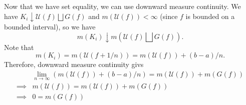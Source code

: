 \documentclass{article}
\begin{document}
\begin{enumerate}
\begin{enumerate}[label=(\alph*)]
        Now that we have set equality, we can use downward measure continuity. We have $K_i \downarrow \mathcal{U}(f) \bigsqcup G(f)$ and $m(\mathcal{U}(f)) < \infty$ (since $f$ is bounded on a bounded interval), so we have
        \begin{equation}
            m(K_i) \downarrow m\left(\mathcal{U}(f) \bigsqcup G(f)\right).
        \end{equation}
        Note that 
        \begin{equation}
            m(K_i) = m(\mathcal{U}(f+1/n)) = m(\mathcal{U}(f)) + (b-a)/n.
        \end{equation}
        Therefore, downward measure continuity givs 
        \begin{align}
            &\lim_{n\to \infty} \left(m(\mathcal{U}(f)) + (b-a)/n \right)= m(\mathcal{U}(f)) + m({G}(f)) \\ 
\implies & m(\mathcal{U}(f)) = m(\mathcal{U}(f)) + m(G(f)) \\ 
\implies & 0 = m(G(f))
        \end{align}


\end{enumerate}
\end{enumerate}
\end{document}
